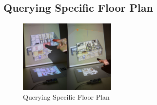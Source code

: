  

\subsection{Querying Specific Floor Plan}

\begin{figure}[b!]
\centering
\includegraphics[width=0.7\columnwidth, height=3.6cm]{4-Interaction_Design/query_plane}
\caption{Querying Specific Floor Plan}
\label{fig:layer}
\end{figure}


